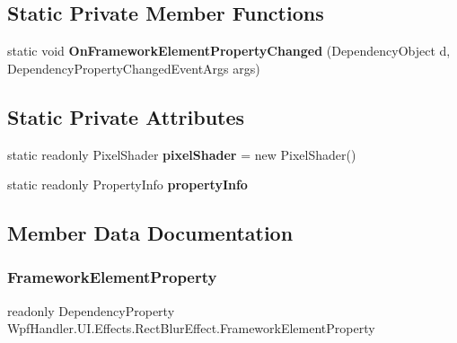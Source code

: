\subsection*{Static Private Member Functions}
\begin{DoxyCompactItemize}
\item 
\mbox{\label{class_wpf_handler_1_1_u_i_1_1_effects_1_1_rect_blur_effect_a194ef2243516f91ffb4ecb0419fdb634}} 
static void {\bfseries On\+Framework\+Element\+Property\+Changed} (Dependency\+Object d, Dependency\+Property\+Changed\+Event\+Args args)
\end{DoxyCompactItemize}
\subsection*{Static Private Attributes}
\begin{DoxyCompactItemize}
\item 
\mbox{\label{class_wpf_handler_1_1_u_i_1_1_effects_1_1_rect_blur_effect_a851f73004a1a6030ac85d0d36d5d074e}} 
static readonly Pixel\+Shader {\bfseries pixel\+Shader} = new Pixel\+Shader()
\item 
\mbox{\label{class_wpf_handler_1_1_u_i_1_1_effects_1_1_rect_blur_effect_a87d037dc36ff72dbeff3fce597331eb0}} 
static readonly Property\+Info {\bfseries property\+Info}
\end{DoxyCompactItemize}


\subsection{Member Data Documentation}
\mbox{\label{class_wpf_handler_1_1_u_i_1_1_effects_1_1_rect_blur_effect_a140029690d8c4a72b4b9a003e7a4643c}} 
\subsubsection{\texorpdfstring{Framework\+Element\+Property}{FrameworkElementProperty}}
{\footnotesize\ttfamily readonly Dependency\+Property Wpf\+Handler.\+U\+I.\+Effects.\+Rect\+Blur\+Effect.\+Framework\+Element\+Property\hspace{0.3cm}{\ttfamily [static]}}

